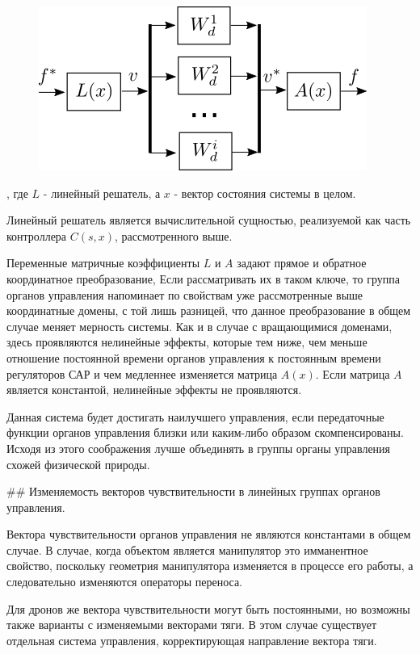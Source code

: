{
\begin{figure}[H]
\centering
\includegraphics{./src/slau.png}
\end{figure}
}

, где $L$ - линейный решатель, а $x$ - вектор состояния системы в целом. 

Линейный решатель является вычислительной сущностью, реализуемой как часть контроллера $C(s,x)$, рассмотренного выше.

Переменные матричные коэффициенты $L$ и $A$ задают прямое и обратное координатное преобразование, Если рассматривать их в таком ключе, то группа органов управления напоминает по свойствам уже рассмотренные выше координатные домены, с той лишь разницей, что данное преобразование в общем случае меняет мерность системы. Как и в случае с вращающимися доменами, здесь проявляются нелинейные эффекты, которые тем ниже, чем меньше отношение постоянной времени органов управления к постоянным времени регуляторов САР и чем медленнее изменяется матрица $A(x)$. Если матрица $A$ является константой, нелинейные эффекты не проявляются. 

Данная система будет достигать наилучшего управления, если передаточные функции органов управления близки или каким-либо образом скомпенсированы. Исходя из этого соображения лучше объединять в группы органы управления схожей физической природы.

## Изменяемость векторов чувствительности в линейных группах органов управления.

Вектора чувствительности органов управления не являются константами в общем случае. В случае, когда объектом является манипулятор это имманентное свойство, поскольку геометрия манипулятора изменяется в процессе его работы, а следовательно изменяются операторы переноса. 

Для дронов же вектора чувствительности могут быть постоянными, но возможны также варианты с изменяемыми векторами тяги. В этом случае существует отдельная система управления, корректирующая направление вектора тяги.

